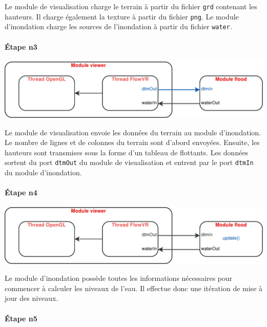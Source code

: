 \documentclass[a4paper, 12pt]{article}
\begin{document}
Le module de visualisation charge le terrain à partir du fichier \texttt{grd}
contenant les hauteurs. Il charge également la texture à partir du fichier
\texttt{png}. Le module d'inondation charge les sources de l'inondation à
partir du fichier \texttt{water}.

\paragraph*{Étape n3}

\begin{center}
\includegraphics[scale=0.4]{include/schemas/3.pdf}
\end{center}

Le module de visualisation envoie les données du terrain au module d'inondation.
Le nombre de lignes et de colonnes du terrain sont d'abord envoyées. Ensuite,
les hauteurs sont transmises sous la forme d'un tableau de flottants. Les
données sortent du port \texttt{dtmOut} du module de visualisation et entrent
par le port \texttt{dtmIn} du module d'inondation.

\pagebreak

\paragraph*{Étape n4}

\begin{center}
\includegraphics[scale=0.4]{include/schemas/4.pdf}
\end{center}

Le module d'inondation possède toutes les informations nécessaires pour
commencer à calculer les niveaux de l'eau. Il effectue donc une itération de
mise à jour des niveaux.

\paragraph*{Étape n5}
\end{document}
